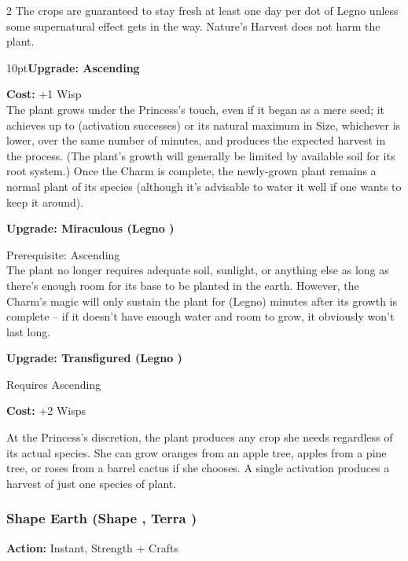 \begin{multicols}{2}
The crops are guaranteed to stay fresh at least one day per dot of Legno unless some supernatural effect gets in the way. Nature's Harvest does not harm the plant. 

\begin{myindentpar}{10pt}\textbf{Upgrade: Ascending}

\noindent \textbf{Cost:} +1 Wisp \\

\noindent The plant grows under the Princess's touch, even if it began as a mere seed; it achieves up to (activation successes) or its natural maximum in Size, whichever is lower, over the same number of minutes, and produces the expected harvest in the process. (The plant's growth will generally be limited by available soil for its root system.) Once the Charm is complete, the newly-grown plant remains a normal plant of its species (although it's advisable to water it well if one wants to keep it around).

\textbf{Upgrade: Miraculous (Legno \textbullet\textbullet)}

\noindent Prerequisite: Ascending \\

\noindent The plant no longer requires adequate soil, sunlight, or anything else as long as there's enough room for its base to be planted in the earth. However, the Charm's magic will only sustain the plant for (Legno) minutes after its growth is complete -- if it doesn't have enough water and room to grow, it obviously won't last long.

\textbf{Upgrade: Transfigured (Legno \textbullet\textbullet\textbullet)}

\noindent Requires Ascending

\noindent \textbf{Cost:} +2 Wisps

At the Princess's discretion, the plant produces any crop she needs regardless of its actual species. She can grow oranges from an apple tree, apples from a pine tree, or roses from a barrel cactus if she chooses. A single activation produces a harvest of just one species of plant. 
\end{myindentpar}

\subsubsection*{Shape Earth (Shape \textbullet, Terra \textbullet)}

\noindent \textbf{Action:} Instant, Strength + Crafts


\end{multicols}
